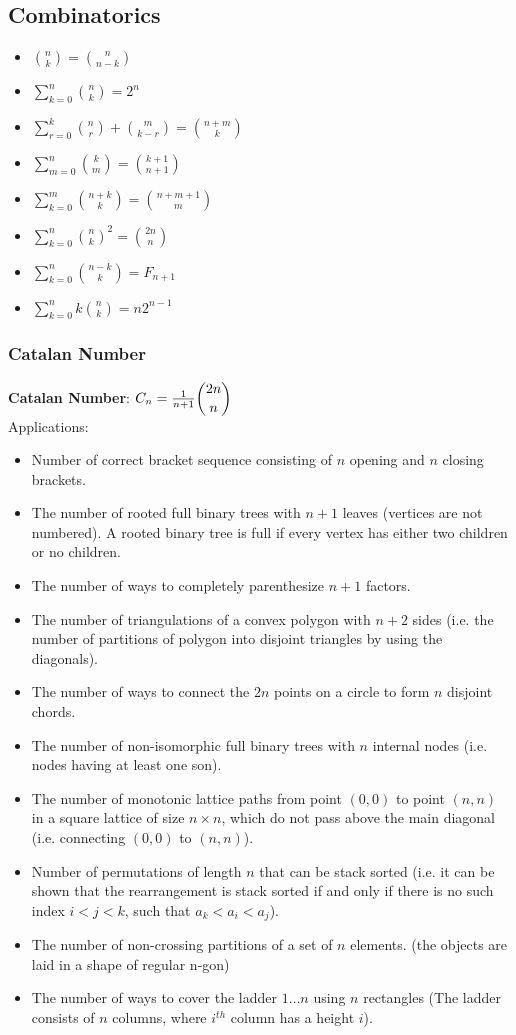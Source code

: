 \subsection{Combinatorics}
\begin{itemize}
    \item $\binom{n}{k} = \binom{n}{n-k}$
    \item $\sum_{k=0}^n\binom{n}{k} = 2^n$
    \item $\sum_{r=0}^k \binom{n}{r} + \binom{m}{k - r} = \binom{n + m}{k}$
    \item $\sum_{m = 0}^n\binom{k}{m} = \binom{k + 1}{n + 1}$
    \item $\sum_{k = 0}^m  \binom {n + k}{k} = \binom {n + m + 1}{m}$
    \item $\sum_{k=0}^n\binom{n}{k}^2 = \binom{2n}{n}$
    \item $\sum_{k=0}^n\binom{n - k}{k} = F_{n+1}$ 
    \item $\sum_{k=0}^nk\binom{n}{k} = n2^{n-1}$ 
\end{itemize}
\subsubsection{Catalan Number}
\textbf{Catalan Number}: $C_n = \frac{1}{n+1}\dbinom{2n}{n}$
\\Applications:
\begin{itemize}
\item Number of correct bracket sequence consisting of $n$ opening and $n$ closing brackets.
\item The number of rooted full binary trees with $n + 1$ leaves (vertices are not numbered). A rooted binary tree is full if every vertex has either two children or no children.
\item The number of ways to completely parenthesize $n + 1$ factors.
\item The number of triangulations of a convex polygon with $n + 2$ sides (i.e. the number of partitions of polygon into disjoint triangles by using the diagonals).
\item The number of ways to connect the $2n$ points on a circle to form $n$ disjoint chords.
\item The number of non-isomorphic full binary trees with $n$ internal nodes (i.e. nodes having at least one son).
\item The number of monotonic lattice paths from point $(0, 0)$ to point $(n, n)$ in a square lattice of size $n \times n$, which do not pass above the main diagonal (i.e. connecting $(0, 0)$ to
$(n, n)$).
\item Number of permutations of length 
$n$ that can be stack sorted (i.e. it can be shown that the rearrangement is stack sorted if and only if there is no such index $i < j < k$, such that $a_k < a_i < a_j$).
\item The number of non-crossing partitions of a set of $n$ elements. (the objects are laid in a shape of regular n-gon)
\item The number of ways to cover the ladder 
$1 \ldots n$ using $n$ rectangles (The ladder consists of $n$ columns, where $i^{th}$ column has a height $i$).
\end{itemize}

